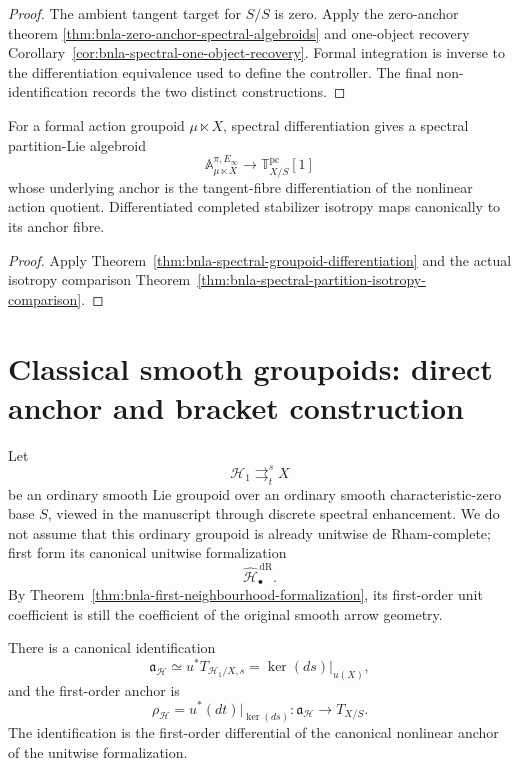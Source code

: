 \begin{proof}
The ambient tangent target for $S/S$ is zero.  Apply the zero-anchor theorem
\ref{thm:bnla-zero-anchor-spectral-algebroids} and one-object recovery
Corollary~\ref{cor:bnla-spectral-one-object-recovery}.  Formal integration is
inverse to the differentiation equivalence used to define the controller.
The final non-identification records the two distinct constructions.
\end{proof}

\begin{proposition}
\label{prop:bnla-spectral-action-algebroid}
For a formal action groupoid $\mu\ltimes X$, spectral differentiation gives a
spectral partition-Lie algebroid
\[
    \mathbb A^{\pi,E_\infty}_{\mu\ltimes X}
    \longrightarrow
    \mathbb T^{\mathrm{pc}}_{X/S}[1]
\]
whose underlying anchor is the tangent-fibre differentiation of the nonlinear
action quotient.  Differentiated completed stabilizer isotropy maps
canonically to its anchor fibre.
\end{proposition}

\begin{proof}
Apply Theorem~\ref{thm:bnla-spectral-groupoid-differentiation} and the actual
isotropy comparison
Theorem~\ref{thm:bnla-spectral-partition-isotropy-comparison}.
\end{proof}

\section{Classical smooth groupoids: direct anchor and bracket construction}
\label{sec:bnla-classical-groupoids}

Let
\[
    \mathcal H_1
    \mathop{\rightrightarrows}^{s}_{t}
    X
\]
be an ordinary smooth Lie groupoid over an ordinary smooth characteristic-zero
base $S$, viewed in the manuscript through discrete spectral enhancement.  We
do not assume that this ordinary groupoid is already unitwise de Rham-complete;
first form its canonical unitwise formalization
\[
    \widehat{\mathcal H}^{\,\mathrm{dR}}_\bullet.
\]
By
Theorem~\ref{thm:bnla-first-neighbourhood-formalization}, its first-order unit
coefficient is still the coefficient of the original smooth arrow geometry.

\begin{theorem}
\label{thm:bnla-classical-anchor}
There is a canonical identification
\[
    \mathfrak a_{\mathcal H}
    \simeq
    u^*T_{\mathcal H_1/X,s}
    =
    \ker(ds)|_{u(X)},
\]
and the first-order anchor is
\[
    \boxed{
    \rho_{\mathcal H}
    =
    u^*(dt)|_{\ker(ds)}:
    \mathfrak a_{\mathcal H}
    \longrightarrow
    T_{X/S}.}
\]
The identification is the first-order differential of the canonical nonlinear
anchor of the unitwise formalization.
\end{theorem}

